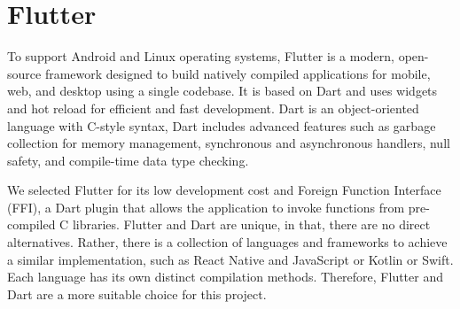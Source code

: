 \section{Flutter}
To support Android and Linux operating systems, Flutter is a modern, open-source framework designed to build natively compiled applications for mobile, web, and desktop using a single codebase. It is based on Dart and uses widgets and hot reload for efficient and fast development. Dart is an object-oriented language with C-style syntax, Dart includes advanced features such as garbage collection for memory management, synchronous and asynchronous handlers, null safety, and compile-time data type checking.

We selected Flutter for its low development cost and Foreign Function Interface (FFI), a Dart plugin that allows the application to invoke functions from pre-compiled C libraries. Flutter and Dart are unique, in that, there are no direct alternatives. Rather, there is a collection of languages and frameworks to achieve a similar implementation, such as React Native and JavaScript or Kotlin or Swift. Each language has its own distinct compilation methods. Therefore, Flutter and Dart are a more suitable choice for this project.
